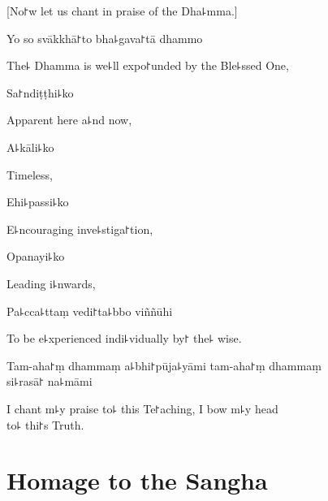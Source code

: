 \begin{leader}
\end{leader}

\begin{english}
  [No꜓w let us chant in praise of the Dha꜕mma.]
\end{english}

%
Yo so svākkhā꜓to bha꜕gava꜓tā dhammo

\begin{english}
  The꜕ Dhamma is we꜕ll expo꜓unded by the Ble꜕ssed One,
\end{english}

Sa꜓ndiṭṭhi꜕ko

\begin{english}
  Apparent here a꜕nd now,
\end{english}

A꜕kāli꜕ko

\begin{english}
  Timeless,
\end{english}

Ehi꜕passi꜕ko

\begin{english}
  E꜕ncouraging inve꜕stiga꜓tion,
\end{english}

Opanayi꜕ko

\begin{english}
  Leading i꜕nwards,
\end{english}

Pa꜕cca꜕ttaṃ vedi꜓ta꜕bbo viññūhi%

\begin{english}
  To be e꜕xperienced indi꜕vidually by꜓ the꜕ wise.
\end{english}

Tam-aha꜓ṃ dhammaṃ a꜕bhi꜓pūja꜕yāmi tam-aha꜓ṃ dhammaṃ \\si꜕rasā꜓ na꜕māmi

\begin{english}
  I chant m꜕y praise to꜕ this Te꜓aching, I bow m꜕y head\\ to꜕ thi꜓s Truth.
\end{english}

\chapter{Homage to the Sangha}                      %

\begin{leader}
\end{leader}

